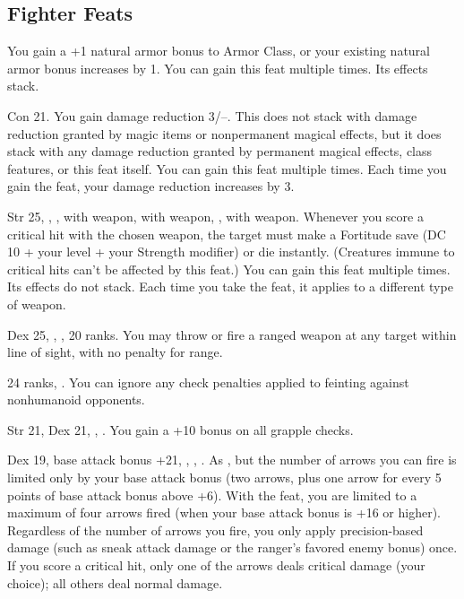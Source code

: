 \subsection{Fighter Feats}
{}{}
{You gain a +1 natural armor bonus to Armor Class, or your existing natural armor bonus increases by 1.}
{}{You can gain this feat multiple times. Its effects stack.}

{}
{Con 21.}
{You gain damage reduction 3/--. This does not stack with damage reduction granted by magic items or nonpermanent magical effects, but it does stack with any damage reduction granted by permanent magical effects, class features, or this feat itself.}
{}{You can gain this feat multiple times. Each time you gain the feat, your damage reduction increases by 3.}

{}
{Str 25, , ,  with weapon,  with weapon, ,  with weapon.}
{Whenever you score a critical hit with the chosen weapon, the target must make a Fortitude save (DC 10 + \onehalf your level + your Strength modifier) or die instantly. (Creatures immune to critical hits can't be affected by this feat.)}
{}{You can gain this feat multiple times. Its effects do not stack. Each time you take the feat, it applies to a different type of weapon.}

{Dex 25, , ,  20 ranks.}
{You may throw or fire a ranged weapon at any target within line of sight, with no penalty for range.}

{ 24 ranks, .}
{You can ignore any check penalties applied to feinting against nonhumanoid opponents.}

{Str 21, Dex 21, , .}
{You gain a +10 bonus on all grapple checks.}

{}
{Dex 19, base attack bonus +21, , , .}
{As , but the number of arrows you can fire is limited only by your base attack bonus (two arrows, plus one arrow for every 5 points of base attack bonus above +6).}
{With the  feat, you are limited to a maximum of four arrows fired (when your base attack bonus is +16 or higher).}
{Regardless of the number of arrows you fire, you only apply precision-based damage (such as sneak attack damage or the ranger's favored enemy bonus) once. If you score a critical hit, only one of the arrows deals critical damage (your choice); all others deal normal damage.}

